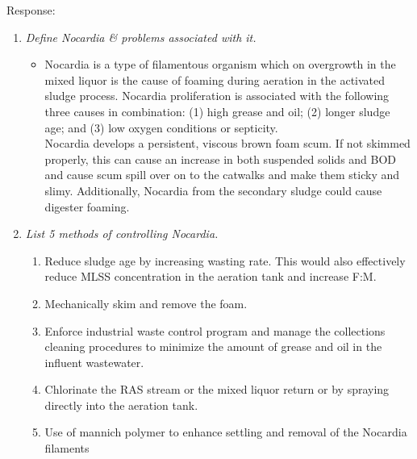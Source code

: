 \begin{enumerate}
Response:\\
\begin{enumerate}[label=\alph*]
\item \textit{Define Nocardia \& problems associated with it.}
\begin{itemize}
\item Nocardia is a type of filamentous organism which on overgrowth in the mixed liquor is the cause of foaming during aeration in the activated sludge process.  Nocardia proliferation is associated with the following three causes in combination: (1) high grease and oil; (2) longer sludge age; and (3) low oxygen conditions or septicity.\\ 
\noindent Nocardia develops a persistent, viscous brown foam scum.  If not skimmed properly, this can cause an increase in both suspended solids and BOD and cause scum spill over on to the catwalks and make them sticky and slimy.  Additionally, Nocardia from the secondary sludge could cause digester foaming. 
\end{itemize}
\item \textit{List 5 methods of controlling Nocardia.}
\begin{enumerate}
\item Reduce sludge age by increasing wasting rate.  This would also effectively reduce MLSS concentration in the aeration tank and increase F:M.
\item Mechanically skim and remove the foam.
\item Enforce industrial waste control program and manage the collections cleaning procedures to minimize the amount of grease and oil in the influent wastewater.
\item Chlorinate the RAS stream or the mixed liquor return or by spraying directly into the aeration tank.
\item Use of mannich polymer to enhance settling and removal of the Nocardia filaments
\end{enumerate}
\end{enumerate}


\end{enumerate}

